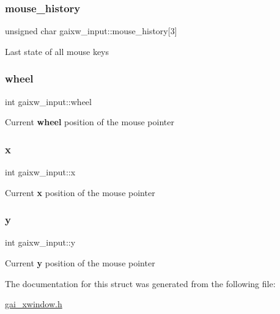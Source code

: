 \subsubsection{\texorpdfstring{mouse\+\_\+history}{mouse\_history}}
{\footnotesize\ttfamily unsigned char gaixw\+\_\+input\+::mouse\+\_\+history\mbox{[}3\mbox{]}}

Last state of all mouse keys \mbox{\label{structgaixw__input_ae6229830f34a6c71c9c5ffad8a199f77}} 
\subsubsection{\texorpdfstring{wheel}{wheel}}
{\footnotesize\ttfamily int gaixw\+\_\+input\+::wheel}

Current {\bfseries wheel} position of the mouse pointer \mbox{\label{structgaixw__input_adf849b2f92f76151cfad6633fde93279}} 
\subsubsection{\texorpdfstring{x}{x}}
{\footnotesize\ttfamily int gaixw\+\_\+input\+::x}

Current {\bfseries x} position of the mouse pointer \mbox{\label{structgaixw__input_a8b654effdd08d54fc8664aa2b89294ff}} 
\subsubsection{\texorpdfstring{y}{y}}
{\footnotesize\ttfamily int gaixw\+\_\+input\+::y}

Current {\bfseries y} position of the mouse pointer 

The documentation for this struct was generated from the following file\+:\begin{DoxyCompactItemize}
\item 
\hyperlink{gai__xwindow_8h}{gai\+\_\+xwindow.\+h}\end{DoxyCompactItemize}
